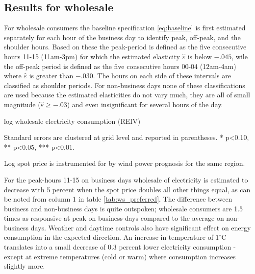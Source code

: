 \label{sec:results}
\subsection{Results for wholesale}
\label{subsec:r_wholesale}
For wholesale consumers the baseline specification \eqref{eq:baseline} is first estimated separately for each hour of the business day to identify peak, off-peak, and the shoulder hours. Based on these the peak-period is defined as the five consecutive hours 11-15 (11am-3pm) for which the estimated elasticity $\widehat{\varepsilon}$ is below $-.045$, wile the off-peak period is defined as the five consecutive hours 00-04 (12am-4am) where $\widehat{\varepsilon}$ is greater than $-.030$. The hours on each side of these intervals are classified as shoulder periods. For non-business days none of these classifications are used because the estimated elasticities do not vary much, they are all of small magnitude ($\widehat{\varepsilon}\geq-.03$)  and even insignificant for several hours of the day.

\begin{table}[H]
\begin{threeparttable}
  \centering
  \caption{log wholesale electricity consumption (REIV)}
  \footnotesize
        
    \begin{tablenotes}
    \item Standard errors are clustered at grid level and reported in parentheses. * p<0.10, ** p<0.05, *** p<0.01.
    \item Log spot price is instrumented for by wind power prognosis for the same region.
     \end{tablenotes}
  \label{tab:ws_preferred}
\end{threeparttable}
\end{table}
\noindent
For the peak-hours 11-15 on business days wholesale of electricity is estimated to decrease with 5 percent when the spot price doubles all other things equal, as can be noted from column 1 in table \ref{tab:ws_preferred}. The difference between business and non-business days is quite outspoken; wholesale consumers are 1.5 times as responsive at peak on business-days compared to the average on non-business days. Weather and daytime controls also have significant effect on energy consumption in the expected direction. An increase in temperature of  $1^{\circ}$C translates into a small decrease of 0.3 percent lower electricity consumption - except at extreme temperatures (cold or warm) where consumption increases slightly more.

